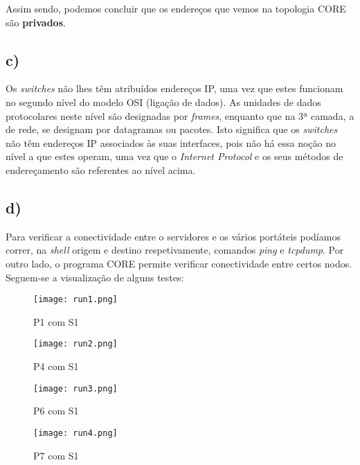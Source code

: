 \documentclass{llncs}
\begin{document}
Assim sendo, podemos concluir que os endereços que vemos na topologia CORE são \textbf{privados}.

\subsection*{c)}

Os \textit{switches} não lhes têm atribuídos endereços IP, uma vez que estes funcionam no segundo nível do modelo OSI (ligação de dados). As unidades de dados protocolares neste nível são designadas por \textit{frames}, enquanto que na 3ª camada, a de rede, se designam por datagramas ou pacotes. Isto significa que os \textit{switches} não têm endereços IP associados às suas interfaces, pois não há essa noção no nível a que estes operam, uma vez que o \textit{Internet Protocol} e os seus métodos de endereçamento são referentes ao nível acima.

\subsection*{d)}

Para verificar a conectividade entre o servidores e os vários portáteis podíamos correr, na \textit{shell} origem e destino respetivamente, comandos \textit{ping} e \textit{tcpdump}. Por outro lado, o programa CORE permite verificar conectividade entre certos nodos. Seguem-se a visualização de alguns testes:

\vspace{-2.5em}

\begin{figure}[!ht]
    \centering
    \begin{minipage}{0.40\textwidth}
        \centering
        \texttt{[image: run1.png]} %
        \caption{P1 com S1}
    \end{minipage}\hfill
    \begin{minipage}{0.40\textwidth}
        \centering
        \texttt{[image: run2.png]} %
        \caption{P4 com S1}
    \end{minipage}

\end{figure}

\vspace{-4.9em}

\begin{figure}[!ht]
    \centering
    \begin{minipage}{0.40\textwidth}
        \centering
        \texttt{[image: run3.png]} %
        \caption{P6 com S1}
    \end{minipage}\hfill
    \begin{minipage}{0.40\textwidth}
        \centering
        \texttt{[image: run4.png]} %
        \caption{P7 com S1}
    \end{minipage}
\end{figure}
\end{document}
